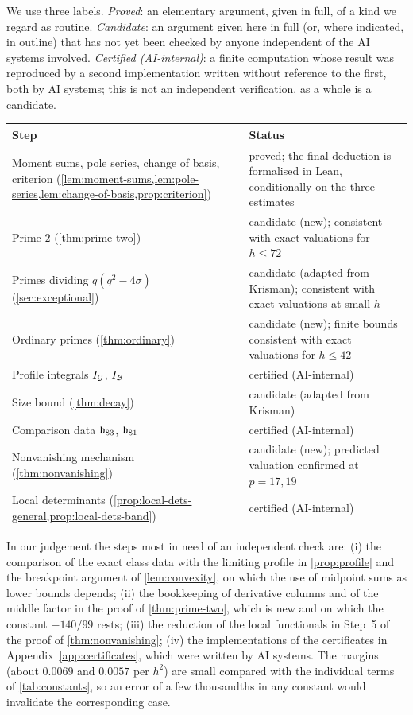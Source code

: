 We use three labels. \emph{Proved}: an elementary argument, given in full, of a kind we regard
as routine. \emph{Candidate}: an argument given here in full (or, where indicated, in outline)
that has not yet been checked by anyone independent of the AI systems involved.
\emph{Certified (AI-internal)}: a finite computation whose result was reproduced by a second
implementation written without reference to the first, both by AI systems; this is not an
independent verification.  as a whole is a candidate.
\begin{center}
\small
\begin{tabular}{@{}p{}p{}@{}}
\toprule
Step & Status\\
\midrule
Moment sums, pole series, change of basis, criterion
(\cref{lem:moment-sums,lem:pole-series,lem:change-of-basis,prop:criterion}) & proved; the final
deduction is formalised in Lean, conditionally on the three estimates\\
Prime $2$ (\cref{thm:prime-two}) & candidate (new); consistent with exact valuations for
$h\le72$\\
Primes dividing $q(q^2-4\sigma)$ (\cref{sec:exceptional}) & candidate (adapted from Krisman);
consistent with exact valuations at small $h$\\
Ordinary primes (\cref{thm:ordinary}) & candidate (new); finite bounds consistent with exact
valuations for $h\le42$\\
Profile integrals $I_{\mathcal{G}}$, $I_{\mathcal{B}}$ & certified (AI-internal)\\
Size bound (\cref{thm:decay}) & candidate (adapted from Krisman)\\
Comparison data $\mathfrak{b}_{83}$, $\mathfrak{b}_{81}$ & certified (AI-internal)\\
Nonvanishing mechanism (\cref{thm:nonvanishing}) & candidate (new); predicted valuation confirmed
at $p=17,19$\\
Local determinants (\cref{prop:local-dets-general,prop:local-dets-band}) & certified
(AI-internal)\\
\bottomrule
\end{tabular}
\end{center}

\begin{remark}\label{rem:scrutiny}
In our judgement the steps most in need of an independent check are: (i) the comparison of the
exact class data with the limiting profile in \cref{prop:profile} and the breakpoint argument of
\cref{lem:convexity}, on which the use of midpoint sums as lower bounds depends; (ii) the bookkeeping of derivative columns and
of the middle factor in the proof of \cref{thm:prime-two}, which is new and on which the constant
$-140/99$ rests; (iii) the reduction of the local functionals in Step~5 of the proof of
\cref{thm:nonvanishing}; (iv) the implementations of the certificates in
Appendix~\ref{app:certificates}, which were written by AI systems. The margins (about $0.0069$ and $0.0057$
per $h^2$) are small compared with the individual terms of \cref{tab:constants}, so an error of
a few thousandths in any constant would invalidate the corresponding case.
\end{remark}
